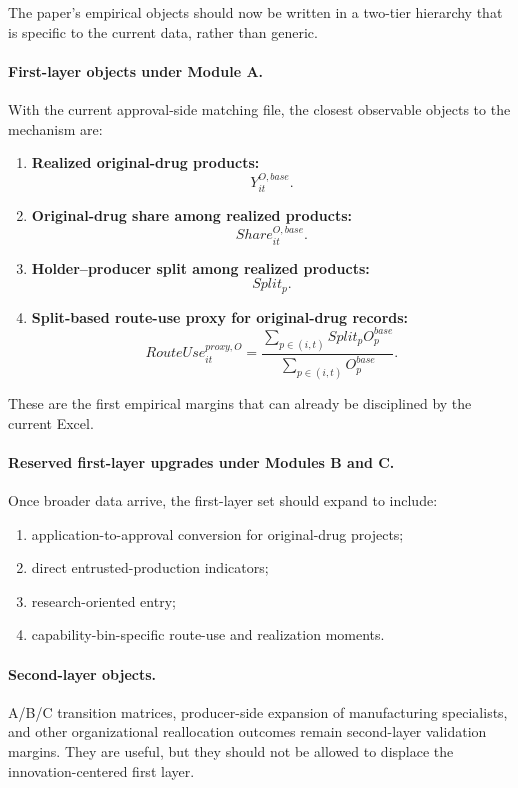 \documentclass[12pt]{article}
\begin{document}
The paper's empirical objects should now be written in a two-tier hierarchy that is specific to the
current data, rather than generic.

\paragraph{First-layer objects under Module A.}
With the current approval-side matching file, the closest observable objects to the mechanism are:

\begin{enumerate}
\item \textbf{Realized original-drug products:}
\[
Y_{it}^{O,base}.
\]

\item \textbf{Original-drug share among realized products:}
\[
Share_{it}^{O,base}.
\]

\item \textbf{Holder--producer split among realized products:}
\[
Split_p.
\]

\item \textbf{Split-based route-use proxy for original-drug records:}
\[
RouteUse_{it}^{proxy,O}
=
\frac{\sum_{p\in(i,t)} Split_p O_p^{base}}{\sum_{p\in(i,t)} O_p^{base}}.
\]
\end{enumerate}

These are the first empirical margins that can already be disciplined by the current Excel.

\paragraph{Reserved first-layer upgrades under Modules B and C.}
Once broader data arrive, the first-layer set should expand to include:

\begin{enumerate}
\item application-to-approval conversion for original-drug projects;
\item direct entrusted-production indicators;
\item research-oriented entry;
\item capability-bin-specific route-use and realization moments.
\end{enumerate}

\paragraph{Second-layer objects.}
A/B/C transition matrices, producer-side expansion of manufacturing specialists, and other
organizational reallocation outcomes remain second-layer validation margins. They are useful, but
they should not be allowed to displace the innovation-centered first layer.
\end{document}
